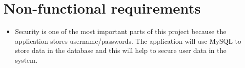 \section{Non-functional requirements}
\begin{itemize}
        \item Security is one of the most important parts of this project because the application stores username/passwords. The application will use MySQL to store data in the database and this will help to secure user data in the system.
\end{itemize}
    